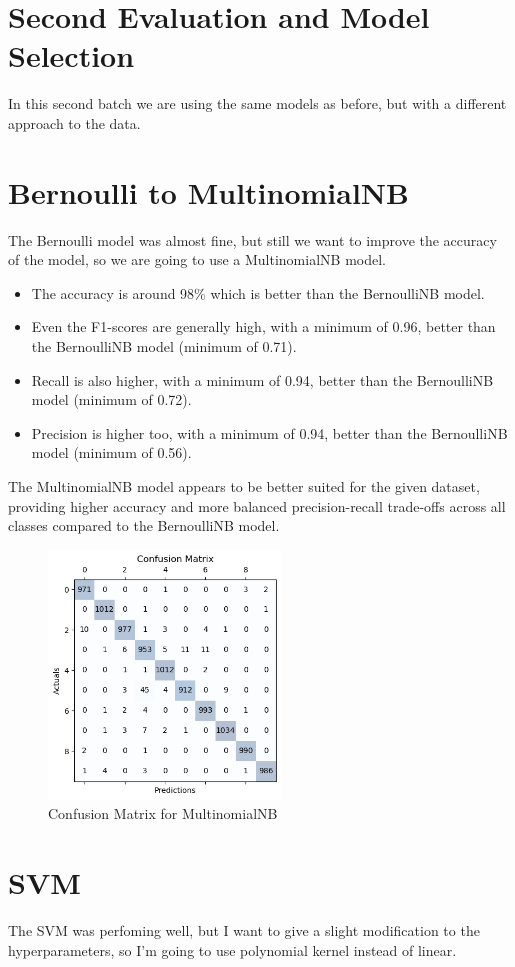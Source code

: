 \documentclass{article}
\begin{document}
\begin{titlepage}
  \section*{Second Evaluation and Model Selection}
  In this second batch we are using the same models as before, but with a different approach to the data.

  \section{Bernoulli to MultinomialNB}
  The Bernoulli model was almost fine, but still we want to improve the accuracy of the model, so we are going to use a MultinomialNB model.

  \begin{itemize}
    \item The accuracy is around 98\% which is better than the BernoulliNB model.
    \item Even the F1-scores are generally high, with a minimum of 0.96, better than the BernoulliNB model (minimum of 0.71).
    \item Recall is also higher, with a minimum of 0.94, better than the BernoulliNB model (minimum of 0.72).
    \item Precision is higher too, with a minimum of 0.94, better than the BernoulliNB model (minimum of 0.56).
  \end{itemize}

  The MultinomialNB model appears to be better suited for the given dataset, providing higher accuracy and more balanced precision-recall trade-offs across all classes compared to the BernoulliNB model.
  \newline
  \newline

  \begin{figure}[htbp]
    \centering
    \includegraphics[width=0.55\textwidth]{MNCM.png}
    \caption{Confusion Matrix for MultinomialNB}
    \label{fig:sample4}
  \end{figure}

  \section{SVM}
  The SVM was perfoming well, but I want to give a slight modification to the hyperparameters, so I'm going to use polynomial kernel instead of linear.

  


\end{titlepage}
\end{document}
